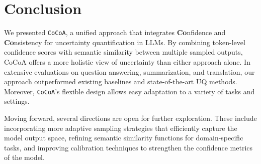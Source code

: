 
\section{Conclusion}
  We presented \texttt{CoCoA}, a unified approach that integrates \textbf{Co}nfidence and \textbf{Co}nsistency for uncertainty quantification in LLMs. By combining token-level confidence scores with semantic similarity between multiple sampled outputs, CoCoA offers a more holistic view of uncertainty than either approach alone. In extensive evaluations on question answering, summarization, and translation, our approach outperformed existing baselines and state-of-the-art UQ methods. Moreover, \texttt{CoCoA}'s flexible design allows easy adaptation to a variety of tasks and settings. 
  
  Moving forward, several directions are open for further exploration. These include incorporating more adaptive sampling strategies that efficiently capture the model output space, refining semantic similarity functions for domain-specific tasks, and improving calibration techniques to strengthen the confidence metrics of the model.

